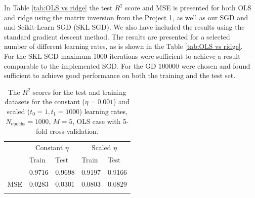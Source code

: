 \documentclass{emulateapj}
\begin{document}
In Table \ref{tab:OLS vs ridge} the test $R^{2}$ score and MSE is presented for both OLS and ridge using the matrix inversion from the Project 1, as well as our SGD and and Scikit-Learn SGD (SKL SGD). We also have included the results using the standard gradient descent method. The results are presented for a selected number of different learning rates, as is shown in the Table \ref{tab:OLS vs ridge}. For the SKL SGD maximum 1000 iterations were sufficient to achieve a result comparable to the implemented SGD. For the GD 100000 were chosen and found sufficient to achieve good performance on both the training and the test set.


\begin{table}[!htb]
\begin{center}
\caption{The $R^2$ scores for the test and training datasets for the constant ($\eta=0.001$) and scaled ($t_0=1, t_1=1000$) learning rates, $N_{\mathrm{epochs}}=1000$, $M=5$, OLS case with 5-fold cross-validation.}
\label{tab:OLS}  
\begin{tabular}{lllll}
\cline{2-5}
\noalign{\smallskip}
\cline{2-5}\noalign{\smallskip}
& \multicolumn{2}{c}{Constant $\eta$} & \multicolumn{2}{c}{Scaled $\eta$}\\
\cline{2-5}\noalign{\smallskip} & Train &  Test  & Train & Test \\
\hline\noalign{\smallskip}
\multicolumn{1}{l|}{$R^2$} & 0.9716 & 0.9698 & 0.9197 & 0.9166 \\
\multicolumn{1}{l|}{MSE} & 0.0283 & 0.0301 & 0.0803 & 0.0829 \\ \noalign{\smallskip}\hline
\end{tabular}
\end{center}
\end{table}
\end{document}
